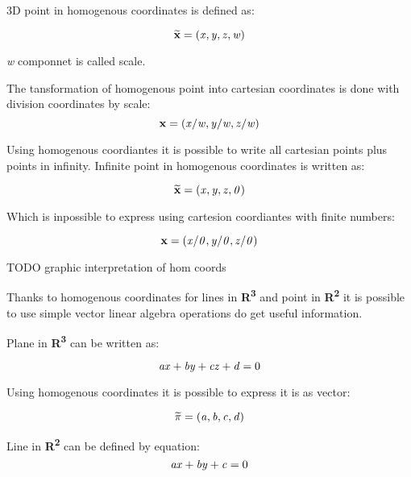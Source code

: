 \documentclass[a4paper,12pt]{report}
\newcommand{\evect}[1]{
{\bf #1}
}
\newcommand{\ehvect}[1]{
{\bf \widetilde{#1}}
}
\newcommand{\escal}[1]{
{\it #1}
}
\newcommand{\eucl}[1]{
{\bf R\textsuperscript{#1}}
}
\begin{document}
3D point in homogenous coordinates is defined as:

\begin{equation}
\ehvect{x} = (\escal{x}, \escal{y}, \escal{z}, \escal{w})
\end{equation}

\escal{w} componnet is called scale.

The tansformation of homogenous point into cartesian coordinates is done with division 
coordinates by scale:
\begin{equation}
\evect{x} = (\escal{x} / \escal{w}, \escal{y} / \escal{w}, \escal{z} / \escal{w})
\end{equation}

Using homogenous coordiantes it is possible to write all cartesian points plus points in infinity.
Infinite point in homogenous coordinates is written as: 

\begin{equation}
\ehvect{x} = (\escal{x}, \escal{y}, \escal{z}, \escal{0})
\end{equation}

Which is inpossible to express using cartesion coordiantes with finite numbers:

\begin{equation}
\evect{x} = (\escal{x} / \escal{0}, \escal{y} / \escal{0}, \escal{z} / \escal{0})
\end{equation}

TODO graphic interpretation of hom coords 

Thanks to homogenous coordinates for lines in \eucl{3} and point in \eucl{2} it is possible to use simple vector linear algebra operations 
do get useful information.


Plane in \eucl{3} can be written as:

\begin{equation}
\escal{a}\escal{x} + \escal{b}\escal{y} + \escal{c}\escal{z} + \escal{d} = 0
\end{equation}

Using homogenous coordinates it is possible to express it is as vector:

\begin{equation}
\ehvect{\pi} =  (\escal{a}, \escal{b}, \escal{c}, \escal{d})
\end{equation}


Line in \eucl{2} can be defined by equation:
\begin{equation}
\escal{a}\escal{x} + \escal{b}\escal{y} + \escal{c} = 0
\end{equation}
\end{document}
